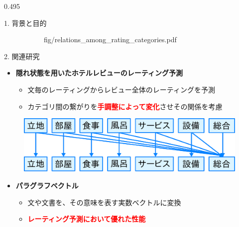 \documentclass[unicode,10pt]{beamer}
\newcommand{\mycolumnwidth}{0.495\textwidth}
\newcommand{\itemtitle}[1]{\textbf{#1}\\}
\newcommand{\fire}[1]{\textcolor{red}{\textbf{#1}}}
\begin{document}
\begin{frame}
\begin{columns}[onlytextwidth,t]
\begin{column}{\mycolumnwidth}
\begin{block}{1. 背景と目的}
\begin{figure}
\begin{subfigure}[t]{0.5\linewidth}
                        {fig/relations_among_rating_categories.pdf}
      \end{subfigure}
      \hspace*{\fill} %
    \end{figure}
  \end{block}

  \begin{block}{2. 関連研究}
    \begin{itemize}
      \item \itemtitle{隠れ状態を用いたホテルレビューのレーティング予測
                       \cite{fujitani15}}
        \begin{itemize}
          \item 文毎のレーティングからレビュー全体のレーティングを予測
          \item カテゴリ間の繋がりを\fire{手調整によって変化}させその関係を考慮
        \end{itemize}
    \end{itemize}
    \begin{figure}
      \includegraphics[width=0.7\linewidth]
          {fig/fujitani_miml_relations_among_rating_categories.pdf}
    \end{figure}
    \begin{itemize}
      \item \itemtitle{パラグラフベクトル\cite{quoc14}}
        \begin{itemize}
          \item 文や文書を、その意味を表す実数ベクトルに変換
          \item \fire{レーティング予測において優れた性能}
        \end{itemize}

\end{itemize}
\end{block}
\end{column}
\end{columns}
\end{frame}
\end{document}
